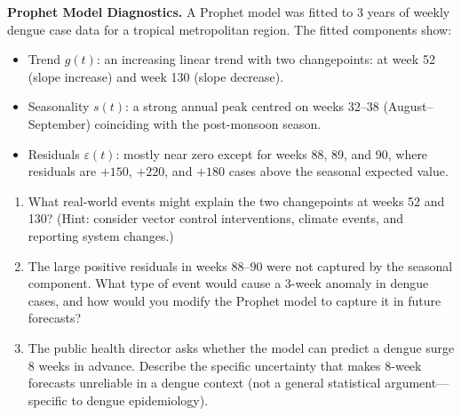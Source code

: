 \ap \textbf{Prophet Model Diagnostics.}
A Prophet model was fitted to 3 years of weekly dengue case data
for a tropical metropolitan region. The fitted components show:
\begin{itemize}
  \item Trend $g(t)$: an increasing linear trend with two changepoints:
        at week 52 (slope increase) and week 130 (slope decrease).
  \item Seasonality $s(t)$: a strong annual peak centred on weeks 32--38
        (August--September) coinciding with the post-monsoon season.
  \item Residuals $\varepsilon(t)$: mostly near zero except for weeks 88,
        89, and 90, where residuals are $+150$, $+220$, and $+180$ cases
        above the seasonal expected value.
\end{itemize}
\begin{enumerate}[label=(\alph*)]
  \item What real-world events might explain the two changepoints at
        weeks 52 and 130? (Hint: consider vector control interventions,
        climate events, and reporting system changes.)
  \item The large positive residuals in weeks 88--90 were not captured
        by the seasonal component. What type of event would cause a
        3-week anomaly in dengue cases, and how would you modify the
        Prophet model to capture it in future forecasts?
  \item The public health director asks whether the model can predict a
        dengue surge 8 weeks in advance. Describe the specific uncertainty that
        makes 8-week forecasts unreliable in a dengue context (not a
        general statistical argument---specific to dengue epidemiology).
\end{enumerate}

